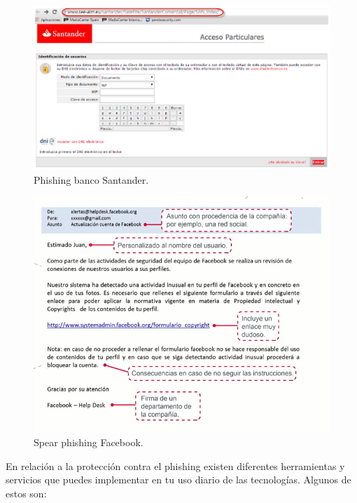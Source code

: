 \documentclass[
  spanish,
  a4paper,
  openany]{book}
\begin{document}
\begin{figure}

{\centering \includegraphics[width=0.75\linewidth]{images/phishing} 

}

\caption{Phishing banco Santander.}\label{fig:unnamed-chunk-16}
\end{figure}

\begin{figure}

{\centering \includegraphics[width=0.75\linewidth]{images/spear-phishing-ejemplo} 

}

\caption{Spear phishing Facebook.}\label{fig:unnamed-chunk-17}
\end{figure}

En relación a la protección contra el phishing existen diferentes herramientas y servicios que puedes implementar en tu uso diario de las tecnologías. Algunos de estos son:
\end{document}
